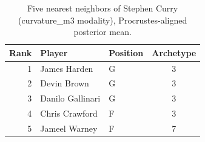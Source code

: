 \begin{table}[htbp]
  \centering\small
  \begin{tabular}{rllc}
    \toprule
    Rank & Player & Position & Archetype \\
    \midrule
    1 & James Harden & G & 3 \\
    2 & Devin Brown & G & 3 \\
    3 & Danilo Gallinari & G & 3 \\
    4 & Chris Crawford & F & 3 \\
    5 & Jameel Warney & F & 7 \\
    \bottomrule
  \end{tabular}
  \caption{Five nearest neighbors of Stephen Curry (curvature_m3 modality), Procrustes-aligned posterior mean.}
  \label{tab:Stephen_Curry_neighbors_curvature_m3}
\end{table}

